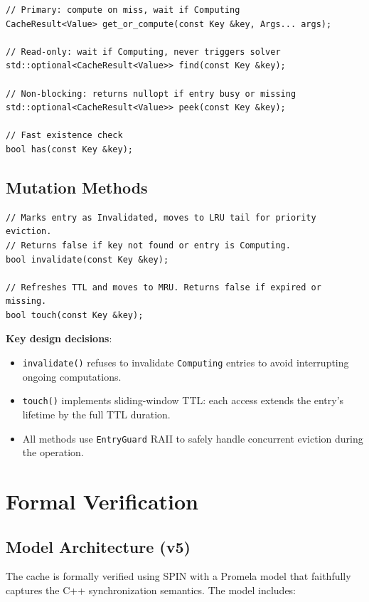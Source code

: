 \documentclass[11pt,a4paper]{article}
\begin{document}
\begin{lstlisting}[caption=Lookup API signatures]
// Primary: compute on miss, wait if Computing
CacheResult<Value> get_or_compute(const Key &key, Args... args);

// Read-only: wait if Computing, never triggers solver
std::optional<CacheResult<Value>> find(const Key &key);

// Non-blocking: returns nullopt if entry busy or missing
std::optional<CacheResult<Value>> peek(const Key &key);

// Fast existence check
bool has(const Key &key);
\end{lstlisting}

\subsection{Mutation Methods}

\begin{lstlisting}[caption=Mutation API signatures]
// Marks entry as Invalidated, moves to LRU tail for priority eviction.
// Returns false if key not found or entry is Computing.
bool invalidate(const Key &key);

// Refreshes TTL and moves to MRU. Returns false if expired or missing.
bool touch(const Key &key);
\end{lstlisting}

\textbf{Key design decisions}:
\begin{itemize}
\item \texttt{invalidate()} refuses to invalidate \texttt{Computing} entries to
      avoid interrupting ongoing computations.
\item \texttt{touch()} implements sliding-window TTL: each access extends the
      entry's lifetime by the full TTL duration.
\item All methods use \texttt{EntryGuard} RAII to safely handle concurrent
      eviction during the operation.
\end{itemize}

\section{Formal Verification}

\subsection{Model Architecture (v5)}

The cache is formally verified using SPIN with a Promela model that faithfully
captures the C++ synchronization semantics. The model includes:
\end{document}

